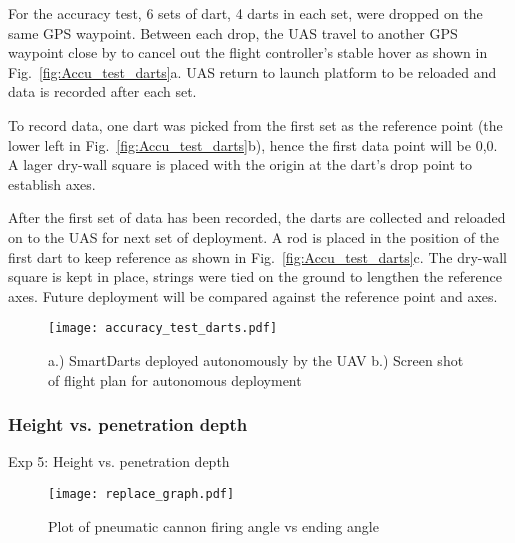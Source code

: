 For the accuracy test, 6 sets of dart, 4 darts in each set, were dropped on the same GPS waypoint. Between each drop, the UAS travel to another GPS waypoint close by to cancel out the flight controller's stable hover as shown in Fig.~\ref{fig:Accu_test_darts}a. UAS return to launch platform to be reloaded and data is recorded after each set.

To record data, one dart was picked from the first set as the reference point (the lower left in Fig.~\ref{fig:Accu_test_darts}b), hence the first data point will be 0,0. A lager dry-wall square is placed with the origin at the dart's drop point to establish axes.

After the first set of data has been recorded, the darts are collected and reloaded on to the UAS for next set of deployment. A rod is placed in the position of the first dart to keep reference as shown in Fig.~\ref{fig:Accu_test_darts}c. The dry-wall square is kept in place, strings were tied on the ground to lengthen the reference axes. Future deployment will be compared against the reference point and axes.


\begin{figure} \centering
  {\texttt{[image: accuracy\_test\_darts.pdf]}}
 \caption{a.) SmartDarts deployed autonomously by the UAV b.) Screen shot of flight plan for autonomous deployment} 
 \label{fig:TradvsAutoDrop}
\end{figure}

\subsubsection{Height vs. penetration depth}
Exp 5: Height vs. penetration depth


\begin{figure} \centering
  {\texttt{[image: replace\_graph.pdf]}}
 \caption{Plot of pneumatic cannon firing angle vs ending angle} 
 \label{fig:TradvsAutoDrop}
\end{figure}
